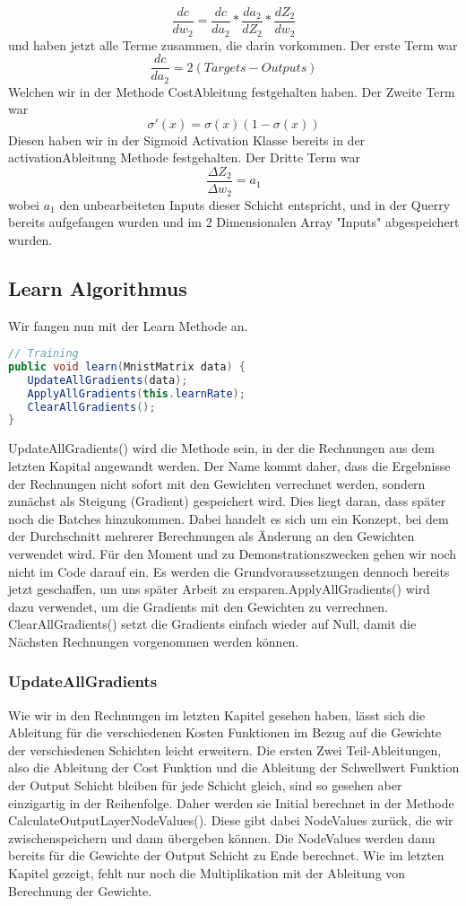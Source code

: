 \documentclass[12pt]{article}
\begin{document}
$$\frac{ dc }{ dw_{ 2 } }=
\frac{ dc }{ da_{ 2 } }*
\frac{ da_{ 2 } }{ dZ_{ 2 } }*
\frac{ dZ_{ 2 } }{ dw_{ 2 } }$$
und haben jetzt alle Terme zusammen, die darin vorkommen. Der erste Term war 
$$\frac{dc}{da_2}=2(Targets-Outputs)$$
Welchen wir in der Methode CostAbleitung festgehalten haben.
Der Zweite Term war
$$\sigma '(x)=\sigma (x)(1-\sigma(x))$$
Diesen haben wir in der Sigmoid Activation Klasse bereits in der activationAbleitung Methode festgehalten.
Der Dritte Term war
$$\frac{\Delta Z_2}{\Delta w_2}=a_1$$
wobei $a_1$ den unbearbeiteten Inputs dieser Schicht entspricht, und in der Querry bereits aufgefangen wurden und im 2 Dimensionalen Array "Inputs" abgespeichert wurden.\subsection{ Learn Algorithmus}Wir fangen nun mit der Learn Methode an.\begin{lstlisting}[language=Java]
// Training
public void learn(MnistMatrix data) {
   UpdateAllGradients(data);
   ApplyAllGradients(this.learnRate);
   ClearAllGradients();
}
\end{lstlisting}UpdateAllGradients() wird die Methode sein, in der die Rechnungen aus dem letzten Kapital angewandt werden. Der Name kommt daher, dass die Ergebnisse der Rechnungen nicht sofort mit den Gewichten verrechnet werden, sondern zunächst als Steigung (Gradient) gespeichert wird. Dies liegt daran, dass später noch die Batches hinzukommen. Dabei handelt es sich um ein Konzept, bei dem der Durchschnitt mehrerer Berechnungen  als Änderung an den Gewichten verwendet wird. Für den Moment und zu Demonstrationszwecken gehen wir noch nicht im Code darauf ein. Es werden die Grundvoraussetzungen dennoch bereits jetzt geschaffen, um uns später Arbeit zu ersparen.ApplyAllGradients() wird dazu verwendet, um die Gradients mit den Gewichten zu verrechnen. 
ClearAllGradients() setzt die Gradients einfach wieder auf Null, damit die Nächsten Rechnungen vorgenommen werden können.\subsubsection{ UpdateAllGradients}Wie wir in den Rechnungen im letzten Kapitel gesehen haben, lässt sich die Ableitung für die verschiedenen Kosten Funktionen im Bezug auf die Gewichte der verschiedenen Schichten leicht erweitern. Die ersten Zwei Teil-Ableitungen, also die Ableitung der Cost Funktion und die Ableitung der Schwellwert Funktion der Output Schicht bleiben für jede Schicht gleich, sind so gesehen aber einzigartig in der Reihenfolge. Daher werden sie Initial berechnet in der Methode CalculateOutputLayerNodeValues(). Diese gibt dabei NodeValues zurück, die wir zwischenspeichern und dann übergeben können. Die NodeValues werden dann bereits für die Gewichte der Output Schicht zu Ende berechnet. Wie im letzten Kapitel gezeigt, fehlt nur noch die Multiplikation mit der Ableitung von Berechnung der Gewichte. 
\end{document}
